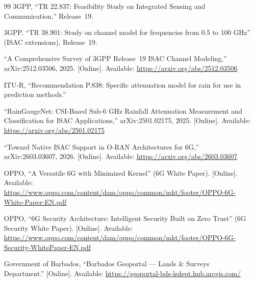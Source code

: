 \documentclass[10pt,twocolumn]{article}
\begin{document}
\begin{thebibliography}{99}
 3GPP, ``TR 22.837: Feasibility Study on Integrated Sensing and
Communication,'' Release~19.

 3GPP, ``TR 38.901: Study on channel model for frequencies from
0.5 to 100 GHz'' (ISAC extensions), Release~19.

 ``A Comprehensive Survey of 3GPP Release~19 ISAC Channel
Modeling,'' arXiv:2512.03506, 2025. [Online]. Available:
\url{https://arxiv.org/abs/2512.03506}

 ITU-R, ``Recommendation P.838: Specific attenuation model for
rain for use in prediction methods.''

 ``RainGaugeNet: CSI-Based Sub-6 GHz Rainfall Attenuation
Measurement and Classification for ISAC Applications,'' arXiv:2501.02175, 2025.
[Online]. Available: \url{https://arxiv.org/abs/2501.02175}

 ``Toward Native ISAC Support in O-RAN Architectures for
6G,'' arXiv:2603.03607, 2026. [Online]. Available:
\url{https://arxiv.org/abs/2603.03607}

 OPPO, ``A Versatile 6G with Minimized Kernel'' (6G White
Paper). [Online]. Available:
\url{https://www.oppo.com/content/dam/oppo/common/mkt/footer/OPPO-6G-White-Paper-EN.pdf}

 OPPO, ``6G Security Architecture: Intelligent Security Built
on Zero Trust'' (6G Security White Paper). [Online]. Available:
\url{https://www.oppo.com/content/dam/oppo/common/mkt/footer/OPPO-6G-Security-WhitePaper-EN.pdf}

 Government of Barbados, ``Barbados Geoportal --- Lands \& Surveys
Department.'' [Online]. Available: \url{https://geoportal-bds-lsdept.hub.arcgis.com/}
\end{thebibliography}
\end{document}

